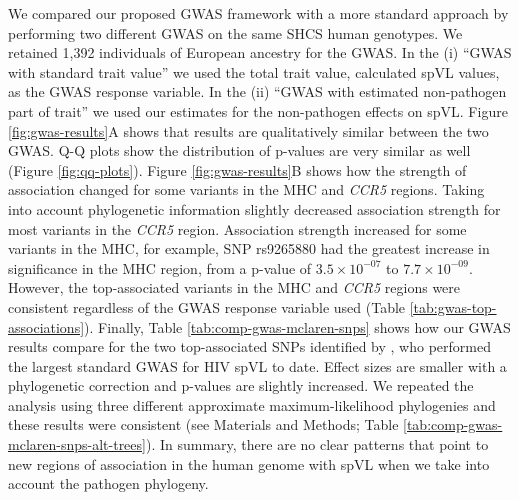 \documentclass[11pt]{article}
\begin{document}
\begin{linenumbers}
We compared our proposed GWAS framework with a more standard approach by performing two different GWAS on the same SHCS human genotypes. We retained 1,392 individuals of European ancestry for the GWAS. In the (i) ``GWAS with standard trait value'' we used the total trait value, calculated spVL values, as the GWAS response variable. In the (ii) ``GWAS with estimated non-pathogen part of trait'' we used our estimates for the non-pathogen effects on spVL. Figure \ref{fig:gwas-results}A shows that results are qualitatively similar between the two GWAS. Q-Q plots show the distribution of p-values are very similar as well (Figure \ref{fig:qq-plots}). Figure \ref{fig:gwas-results}B shows how the strength of association changed for some variants in the MHC and \emph{CCR5} regions. Taking into account phylogenetic information slightly decreased association strength for most variants in the \emph{CCR5} region. Association strength increased for some variants in the MHC, for example, SNP rs9265880 had the greatest increase in significance in the MHC region, from a p-value of $3.5 \times 10^{-07}$ to $7.7 \times 10^{-09}$. However, the top-associated variants in the MHC and \emph{CCR5} regions were consistent regardless of the GWAS response variable used (Table \ref{tab:gwas-top-associations}). Finally, Table \ref{tab:comp-gwas-mclaren-snps} shows how our GWAS results compare for the two top-associated SNPs identified by \citet{McLaren2015}, who performed the largest standard GWAS for HIV spVL to date. Effect sizes are smaller with a phylogenetic correction and p-values are slightly increased. We repeated the analysis using three different approximate maximum-likelihood phylogenies and these results were consistent (see Materials and Methods; Table \ref{tab:comp-gwas-mclaren-snps-alt-trees}). In summary, there are no clear patterns that point to new regions of association in the human genome with spVL when we take into account the pathogen phylogeny.


\end{linenumbers}
\end{document}
